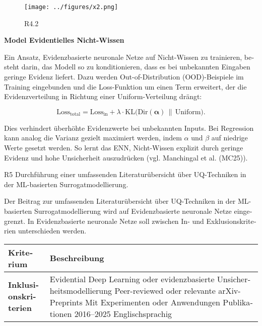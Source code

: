 \begin{otherlanguage}{ngerman}
\begin{figure}[!ht]
  \centering
  \texttt{[image: ../figures/x2.png]}
  \caption{R4.2}
\end{figure}


\textbf{Model Evidentielles Nicht-Wissen}

Ein Ansatz, \gls{Evidenzbasierte neuronale Netze} auf Nicht-Wissen zu trainieren, besteht darin, das Modell so zu konditionieren, dass es bei unbekannten Eingaben geringe Evidenz liefert. Dazu werden Out-of-Distribution (OOD)-Beispiele im Training eingebunden und die Loss-Funktion um einen Term erweitert, der die Evidenzverteilung in Richtung einer Uniform-Verteilung drängt:

\[
\text{Loss}_{\text{total}} = \text{Loss}_{\text{in}} + \lambda \cdot \text{KL}\bigl(\text{Dir}(\boldsymbol{\alpha}) \,\|\, \text{Uniform}\bigr).
\]

Dies verhindert überhöhte Evidenzwerte bei unbekannten Inputs. Bei Regression kann analog die Varianz gezielt maximiert werden, indem $\alpha$ und $\beta$ auf niedrige Werte gesetzt werden. So lernt das ENN, Nicht-Wissen explizit durch geringe Evidenz und hohe Unsicherheit auszudrücken (vgl. Manchingal et al. (MC25)).



\pagebreak


R5 Durchführung einer umfassenden Literaturübersicht über UQ-Techniken in der ML-basierten Surrogatmodellierung.

Der Beitrag zur umfassenden Literaturübersicht über UQ-Techniken in der ML-basierten Surrogatmodellierung wird auf \gls{Evidenzbasierte neuronale Netze} eingegrenzt. In \gls{Evidenzbasierte neuronale Netze} soll zwischen In- und Exklusionskriterien unterschieden werden.

\begin{table}[htbp]
\centering
\footnotesize
\begin{tabularx}{\textwidth}{|l|X|}
\hline
\textbf{Kriterium} & \textbf{Beschreibung} \\ \hline

\textbf{Inklusionskriterien} & 
Evidential Deep Learning oder evidenzbasierte Unsicherheitsmodellierung \newline
Peer-reviewed oder relevante arXiv-Preprints \newline
Mit Experimenten oder Anwendungen \newline
Publikationen 2016–2025 \newline
Englischsprachig \\ \hline


\end{tabularx}
\end{table}
\end{otherlanguage}
